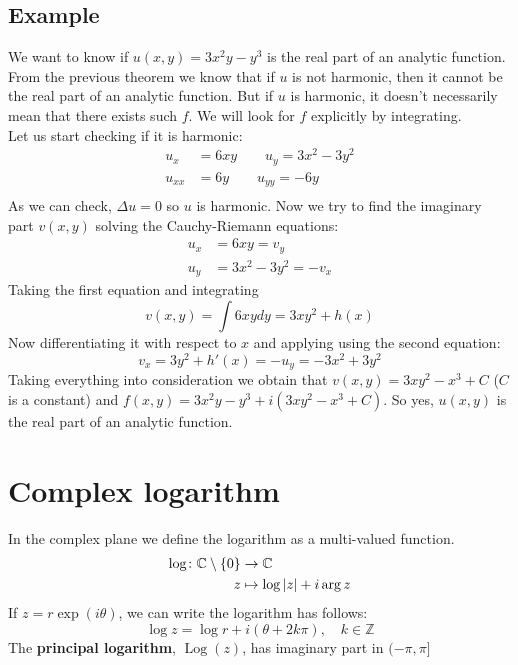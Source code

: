 \documentclass{article}
\def\C{\mathbb{C}}
\def\Z{\mathbb{Z}}
\DeclarePairedDelimiter\abs{\lvert}{\rvert}%
\renewcommand{\exp}[1]{\operatorname{exp}\left(#1\right)}
\newcommand{\Log}[1]{\operatorname{Log}\left(#1\right)}
\begin{document}
    \subsection*{Example}
    We want to know if $u(x,y) = 3x^2y-y^3$ is the real part of an analytic function. From the previous theorem we know that if $u$ is not harmonic, then it cannot be the real part of an analytic function. But if $u$ is harmonic, it doesn't necessarily mean that there exists such $f$. We will look for $f$ explicitly by integrating. \\
    Let us start checking if it is harmonic:
    \begin{align*}
        u_x &= 6xy \quad \quad u_y = 3x^2-3y^2 \\
        u_{xx} &= 6y \quad \quad u_{yy} = -6y \\
    \end{align*}
    As we can check, $\Delta u = 0 $ so $u$ is harmonic. Now we try to find the imaginary part $v(x,y)$ solving the Cauchy-Riemann equations:
    \begin{align*}
        u_x &= 6xy = v_y \\
        u_y &= 3x^2-3y^2 = -v_x
    \end{align*}
    Taking the first equation and integrating
    \begin{equation*}
        v(x,y)=\int6xydy=3xy^2+h(x)
    \end{equation*}
    Now differentiating it with respect to $x$ and applying using the second equation:\\
    \begin{equation*}
        v_x= 3y^2 + h'(x) = -u_y = -3x^2+3y^2
    \end{equation*}
    Taking everything into consideration we obtain that $v(x,y) = 3xy^2 - x^3 + C$ ($C$ is a constant) and $f(x,y)= 3x^2y-y^3+i(3xy^2 - x^3 + C)$. So yes, $u(x,y)$ is the real part of an analytic function.
    \section{Complex logarithm}
    In the complex plane we define the logarithm as a multi-valued function.
    \begin{align*}
        \log\colon \C \setminus \{0\} &\to \C \\
        z &\mapsto \log{\abs{z}} + i\arg{z}
    \end{align*}
    If $z = r\exp{i\theta}$, we can write the logarithm has follows:
    \begin{equation*}
       \log{z} = \log{r} + i(\theta + 2k\pi), \quad k \in \Z
    \end{equation*}
    The \textbf{principal logarithm}, $\Log{z}$, has imaginary part in $(-\pi, \pi]$
\end{document}
